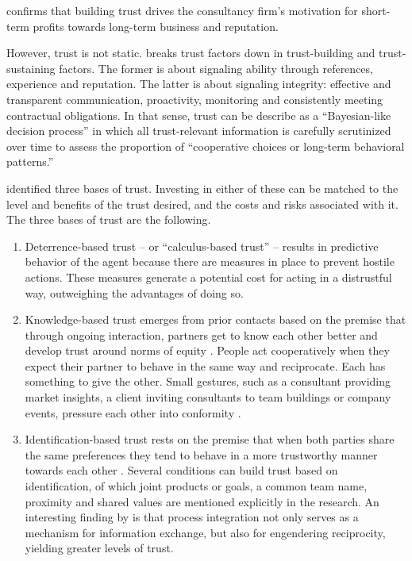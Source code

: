 \documentclass[12pt]{article}
\providecommand{\tightlist}{%
  \setlength{\itemsep}{0pt}\setlength{\parskip}{0pt}}
\begin{document}
\citet[265]{liberatore2010} confirms that building trust drives the
consultancy firm's motivation for short-term profits towards long-term
business and reputation.

However, trust is not static. \citet[193-194]{kirilov2012} breaks trust
factors down in trust-building and trust-sustaining factors. The former
is about signaling ability through references, experience and
reputation. The latter is about signaling integrity: effective and
transparent communication, proactivity, monitoring and consistently
meeting contractual obligations. In that sense, trust can be describe as
a ``Bayesian-like decision process'' in which all trust-relevant
information is carefully scrutinized over time to assess the proportion
of ``cooperative choices or long-term behavioral patterns.'' \citep[
995]{lewicki2006}

\citet[366-374]{shapiro1992} identified three bases of trust. Investing
in either of these can be matched to the level and benefits of the trust
desired, and the costs and risks associated with it. The three bases of
trust are the following.

\begin{enumerate}
\def\labelenumi{\arabic{enumi}.}
\tightlist
\item
  Deterrence-based trust -- or ``calculus-based trust'' \citep[
  119]{lewicki1996} -- results in predictive behavior of the agent
  because there are measures in place to prevent hostile actions. These
  measures generate a potential cost for acting in a distrustful way,
  outweighing the advantages of doing so.
\item
  Knowledge-based trust emerges from prior contacts based on the premise
  that through ongoing interaction, partners get to know each other
  better and develop trust around norms of equity \citep[
  92]{gulati1995}. People act cooperatively when they expect their
  partner to behave in the same way and reciprocate. Each has something
  to give the other. Small gestures, such as a consultant providing
  market insights, a client inviting consultants to team buildings or
  company events, pressure each other into conformity \citep[
  63]{macaulay1963}.
\item
  Identification-based trust rests on the premise that when both parties
  share the same preferences they tend to behave in a more trustworthy
  manner towards each other \citep[ 371]{shapiro1992}. Several
  conditions can build trust based on identification, of which joint
  products or goals, a common team name, proximity and shared values are
  mentioned explicitly in the research. An interesting finding by
  \citet[408]{schoenherr2015} is that process integration not only
  serves as a mechanism for information exchange, but also for
  engendering reciprocity, yielding greater levels of trust.
\end{enumerate}
\end{document}
